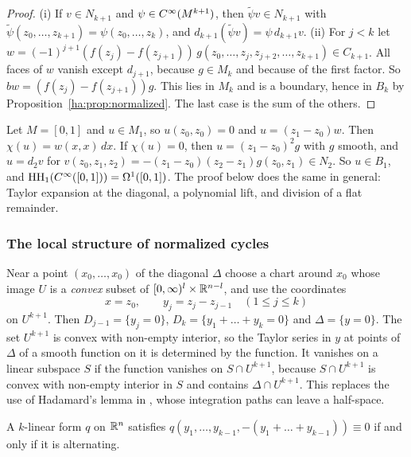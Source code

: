 \begin{proof}
(i) If \(v\in N_{k+1}\) and \(\psi\in C^\infty(M^{k+1})\), then
\(\tilde\psi v\in N_{k+1}\) with \(\tilde\psi(z_0,\dots,z_{k+1})=
\psi(z_0,\dots,z_k)\), and \(d_{k+1}(\tilde\psi v)=\psi\,d_{k+1}v\). (ii)
For \(j<k\) let \(w=(-1)^{j+1}(f(z_j)-f(z_{j+1}))\,g(z_0,\dots,z_j,
z_{j+2},\dots,z_{k+1})\in C_{k+1}\). All faces of \(w\) vanish except
\(d_{j+1}\), because \(g\in M_k\) and because of the first factor. So
\(bw=(f(z_j)-f(z_{j+1}))g\). This lies in \(M_k\) and is a boundary, hence
in \(B_k\) by Proposition~\ref{ha:prop:normalized}. The last case is the
sum of the others.
\end{proof}

\begin{example}[The model \(k=1\)]\label{ha:ex:k1}
Let \(M=[0,1]\) and \(u\in M_1\), so \(u(z_0,z_0)=0\) and
\(u=(z_1-z_0)w\). Then \(\chi(u)=w(x,x)\,dx\). If \(\chi(u)=0\), then
\(u=(z_1-z_0)^2g\) with \(g\) smooth, and \(u=d_2v\) for
\(v(z_0,z_1,z_2)=-(z_1-z_0)(z_2-z_1)g(z_0,z_1)\in N_2\). So \(u\in B_1\), and
\(\operatorname{HH}_1(C^\infty([0,1]))=\Omega^1([0,1])\). The proof below does the same in
general: Taylor expansion at the diagonal, a polynomial lift, and
division of a flat remainder.
\end{example}

\subsubsection*{The local structure of normalized cycles}
Near a point \((x_0,\dots,x_0)\) of the diagonal \(\Delta\) choose a chart
around \(x_0\) whose image \(U\) is a \emph{convex} subset of
\([0,\infty)^l\times\mathbb R^{n-l}\), and use the coordinates
\[
 x=z_0,\qquad y_j=z_j-z_{j-1}\quad(1\le j\le k)
\]
on \(U^{k+1}\). Then \(D_{j-1}=\{y_j=0\}\), \(D_k=\{y_1+\dots+y_k=0\}\) and
\(\Delta=\{y=0\}\). The set \(U^{k+1}\) is convex with non-empty interior,
so the Taylor series in \(y\) at points of \(\Delta\) of a smooth function
on it is determined by the function. It vanishes on a linear subspace
\(S\) if the function vanishes on \(S\cap U^{k+1}\), because \(S\cap
U^{k+1}\) is convex with non-empty interior in \(S\) and contains
\(\Delta\cap U^{k+1}\). This replaces the use of Hadamard's lemma in
\cite{MelroseMicro}, whose integration paths can leave a half-space.

\begin{lemma}\label{ha:lem:antisym}
A \(k\)-linear form \(q\) on \(\mathbb R^n\) satisfies
\(q(y_1,\dots,y_{k-1},-(y_1+\dots+y_{k-1}))\equiv0\) if and only if it is
alternating.
\end{lemma}

